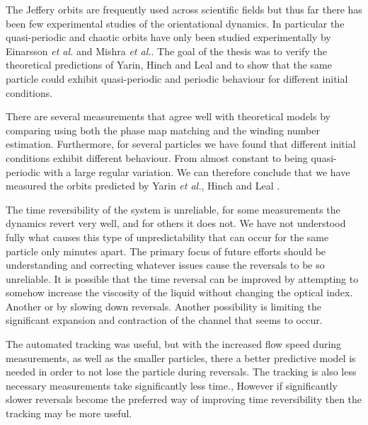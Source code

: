 The Jeffery orbits are frequently used across scientific fields but thus far there has been few experimental studies 
of the orientational dynamics. In particular the quasi-periodic and chaotic orbits have only been studied experimentally
by Einarsson \emph{et al.}\cite{JonasExperiment} and Mishra \emph{et al.}\cite{Mishra}.
The goal of the thesis was to verify the theoretical predictions of Yarin, Hinch and Leal \cite{Yarin, Leal} and to show that the same particle could exhibit quasi-periodic and periodic behaviour for different initial conditions.


There are several measurements that agree well with theoretical models by comparing using both the phase map matching and the winding number estimation. Furthermore, for several particles we have found that different initial conditions exhibit different behaviour. 
From almost constant to being quasi-periodic with a large regular variation. We can therefore conclude that we have measured the
orbits predicted by Yarin \emph{et al.}, Hinch and Leal \cite{Yarin, Leal}.

The time reversibility of the system is unreliable, for some measurements the dynamics revert very well, and for others it does not. 
We have not understood fully what causes this type of unpredictability that can occur for the same particle only 
minutes apart. The primary focus of future efforts should be understanding and correcting whatever issues cause the 
reversals to be so unreliable. It is possible that the time reversal can be improved by attempting to somehow increase the viscosity of the liquid
without changing the optical index. Another or by slowing down reversals. Another possibility is limiting the 
significant expansion and contraction of the channel that seems to occur.

The automated tracking was useful, but with the increased flow speed during measurements, as well as the smaller particles, 
there a better predictive model is needed in order to not lose the particle during reversals. The tracking is also less necessary 
measurements take significantly less time., However if significantly slower reversals become the preferred way of improving 
time reversibility then the tracking may be more useful.
